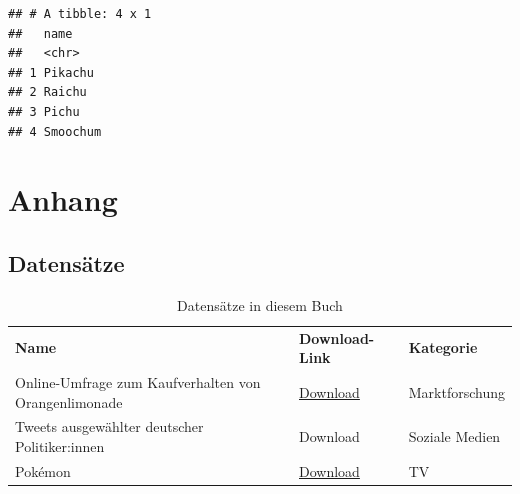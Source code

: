 \documentclass[
]{book}
\begin{document}
\begin{verbatim}
## # A tibble: 4 x 1
##   name    
##   <chr>   
## 1 Pikachu 
## 2 Raichu  
## 3 Pichu   
## 4 Smoochum
\end{verbatim}

\hypertarget{part-anhang}{%
\part*{Anhang}\label{part-anhang}}

\hypertarget{datensaetze}{%
\chapter*{Datensätze}\label{datensaetze}}

\begin{longtable}[]{@{}
  >{\raggedright\arraybackslash}p{}
  >{\raggedright\arraybackslash}p{}
  >{\raggedright\arraybackslash}p{}@{}}
\caption{Datensätze in diesem Buch}\tabularnewline
\toprule
\endhead
\textbf{Name} & \textbf{Download-Link} & \textbf{Kategorie} \\
Online-Umfrage zum Kaufverhalten von Orangenlimonade & \href{datasets/limonade.csv}{Download} & Marktforschung \\
Tweets ausgewählter deutscher Politiker:innen & Download & Soziale Medien \\
Pokémon & \href{datasets/pokemon.csv}{Download} & TV \\
\bottomrule
\end{longtable}

  
\end{document}
